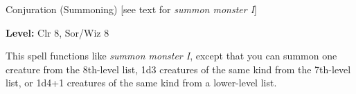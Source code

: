 
Conjuration (Summoning) [see text for \textit{summon monster I}]

\textbf{Level:} Clr 8, Sor/Wiz 8

This spell functions like \textit{summon monster I}, except that you can summon 
one creature from the 8th-level list, 1d3 creatures of the same kind from the 7th-level 
list, or 1d4+1 creatures of the same kind from a lower-level list.

